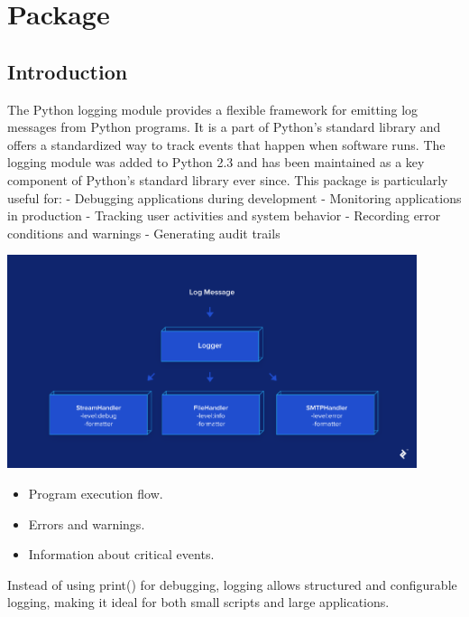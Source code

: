 %
%



\chapter{Package }

\section{Introduction}

The Python logging module provides a flexible framework for emitting log messages
from Python programs. It is a part of Python’s standard library and
offers a standardized way to track events that happen when software runs. The
logging module was added to Python 2.3 and has been maintained as a key
component of Python’s standard library ever since.
This package is particularly useful for: - Debugging applications during development
- Monitoring applications in production - Tracking user activities and
system behavior - Recording error conditions and warnings - Generating audit
trails\cite{Python:2024Logging}

\begin{center}
	\includegraphics[width=0.9\textwidth]{Images/Logging/Logging_Types.png}
	\end{center}

\begin{itemize}
	\item Program execution flow.
	\item Errors and warnings.
	\item Information about critical events.
\end{itemize}
Instead of using print() for debugging, logging allows structured and configurable logging, making it ideal for both small scripts and large applications.
\bigskip



